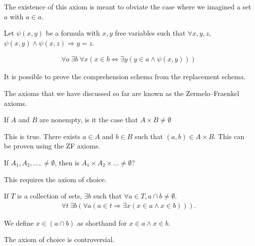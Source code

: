 \documentclass[10pt]{mypackage}
\begin{document}
\begin{remark}
  The existence of this axiom is meant to obviate the case where we imagined a set $a$ with $a\in a$.
\end{remark}
\begin{definition}
  Let $\psi(x,y)$ be a formula with $x,y$ free variables such that $\forall x,y,z$, $\psi(x,y)\wedge \psi(x,z)\Rightarrow y = z$.
\end{definition}
\begin{axiom}
  \begin{align*}
    \forall a\:\exists b\:\forall x\left(x\in b \Leftrightarrow \exists y\left(y\in a\wedge \psi(x,y)\right)\right)
  \end{align*}
\end{axiom}
\begin{remark}
  It is possible to prove the comprehension schema from the replacement schema.
\end{remark}
The axioms that we have discussed so far are known as the Zermelo--Fraenkel axioms. 
\begin{question}
  If $A$ and $B$ are nonempty, is it the case that $A\times B \neq \emptyset$
\begin{answer}
  This is true. There exists $a\in A$ and $b\in B$ such that $(a,b)\in A\times B$. This can be proven using the ZF axioms.
\end{answer}
\end{question}
\begin{question}
  If $A_1,A_2,\dots,\neq\emptyset$, then is $A_1\times A_2\times \dots \neq \emptyset$?
\begin{answer}
  This requires the axiom of choice.
\end{answer}
\end{question}
\begin{axiom}[Choice]
  If $T$ is a collection of sets, $\exists b$ such that $\forall a\in T, a\cap b \neq \emptyset$.
  \begin{align*}
    \forall t\:\exists b\left(\forall a\left(a\in t \Rightarrow \exists x\left(x\in a \wedge x\in b\right)\right)\right).
  \end{align*}
\end{axiom}
\begin{remark}
  We define $x\in \left(a\cap b\right) $ as shorthand for $ x\in a \wedge x\in b$.
\end{remark}
\begin{remark}
  The axiom of choice is controversial. 
\end{remark}
\end{document}
